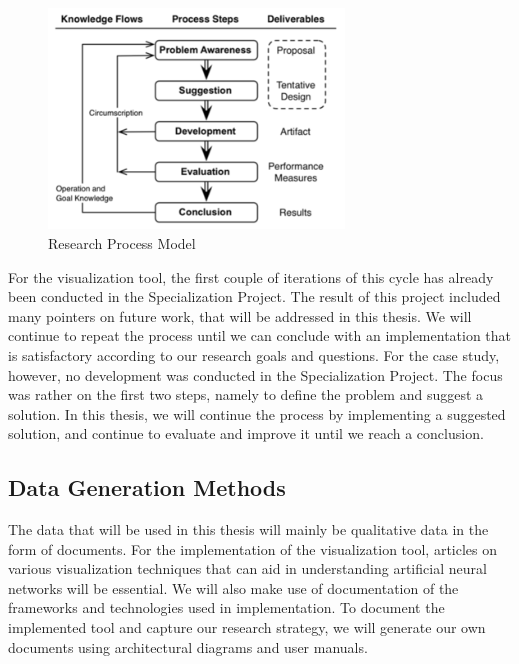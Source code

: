 \begin{figure}[h!]
    \centering
        \includegraphics[width=0.7\textwidth]{fig/dsr-cycle.png}
        \caption{Research Process Model\cite{designscience}}
        \label{dsr-cycle}
\end{figure}

\noindent For the visualization tool, the first couple of iterations of this cycle has already been conducted in the Specialization Project. The result of this project included many pointers on future work, that will be addressed in this thesis. We will continue to repeat the process until we can conclude with an implementation that is satisfactory according to our research goals and questions. For the case study, however, no development was conducted in the Specialization Project. The focus was rather on the first two steps, namely to define the problem and suggest a solution. In this thesis, we will continue the process by implementing a suggested solution, and continue to evaluate and improve it until we reach a conclusion.\\

\subsection{Data Generation Methods}

The data that will be used in this thesis will mainly be qualitative data in the form of documents. For the implementation of the visualization tool, articles on various visualization techniques that can aid in understanding artificial neural networks will be essential. We will also make use of documentation of the frameworks and technologies used in implementation. To document the implemented tool and capture our research strategy, we will generate our own documents using architectural diagrams and user manuals. \\

